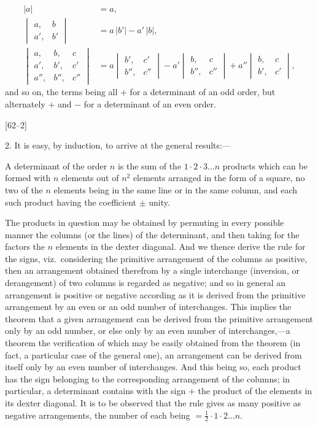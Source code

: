 \documentclass[12pt,a4paper,oneside]{book}
\newcommand{\paperref}[1]{\par\noindent\hfill[#1]\hfill\null\par}
\begin{document}
\begin{align*}
|a| &= a,\\
\begin{vmatrix} a, & b \\ a', & b' \end{vmatrix} &= a\,|b'| - a'\,|b|,\\
\begin{vmatrix} a, & b, & c \\ a', & b', & c' \\ a'', & b'', & c'' \end{vmatrix} &= a\begin{vmatrix} b', & c' \\ b'', & c'' \end{vmatrix} - a'\begin{vmatrix} b, & c \\ b'', & c'' \end{vmatrix} + a''\begin{vmatrix} b, & c \\ b', & c' \end{vmatrix},
\end{align*}
and so on, the terms being all $+$ for a determinant of an odd order, but alternately $+$ and $-$ for a determinant of an even order.

\paperref{62--2}
\newpage
2. It is easy, by induction, to arrive at the general results:---

A determinant of the order $n$ is the sum of the $1\cdot 2\cdot 3\dots n$ products which can be formed with $n$ elements out of $n^{2}$ elements arranged in the form of a square, no two of the $n$ elements being in the same line or in the same column, and each such product having the coefficient $\pm$ unity.

The products in question may be obtained by permuting in every possible manner the columns (or the lines) of the determinant, and then taking for the factors the $n$ elements in the dexter diagonal. And we thence derive the rule for the signs, viz.\ considering the primitive arrangement of the columns as positive, then an arrangement obtained therefrom by a single interchange (inversion, or derangement) of two columns is regarded as negative; and so in general an arrangement is positive or negative according as it is derived from the primitive arrangement by an even or an odd number of interchanges. This implies the theorem that a given arrangement can be derived from the primitive arrangement only by an odd number, or else only by an even number of interchanges,---a theorem the verification of which may be easily obtained from the theorem (in fact, a particular case of the general one), an arrangement can be derived from itself only by an even number of interchanges. And this being so, each product has the sign belonging to the corresponding arrangement of the columns; in particular, a determinant contains with the sign $+$ the product of the elements in its dexter diagonal. It is to be observed that the rule gives as many positive as negative arrangements, the number of each being $=\tfrac{1}{2}\cdot 1\cdot 2\dots n$.
\end{document}
